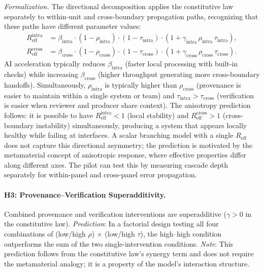 \documentclass[runningheads]{llncs}
\begin{document}
\emph{Formalization.} The directional decomposition applies the constitutive law separately to within-unit and cross-boundary propagation paths, recognizing that these paths have different parameter values:
\begin{align}
R_{\mathrm{eff}}^{\mathrm{intra}} &= \beta_{\mathrm{intra}} \cdot (1-\rho_{\mathrm{intra}}) \cdot (1-\tau_{\mathrm{intra}}) \cdot (1+\gamma_{\mathrm{intra}}\, \rho_{\mathrm{intra}}\, \tau_{\mathrm{intra}}), \label{eq:rintra} \\
R_{\mathrm{eff}}^{\mathrm{cross}} &= \beta_{\mathrm{cross}} \cdot (1-\rho_{\mathrm{cross}}) \cdot (1-\tau_{\mathrm{cross}}) \cdot (1+\gamma_{\mathrm{cross}}\, \rho_{\mathrm{cross}}\, \tau_{\mathrm{cross}}). \label{eq:rcross}
\end{align}
AI acceleration typically reduces $\beta_{\mathrm{intra}}$ (faster local processing with built-in checks) while increasing $\beta_{\mathrm{cross}}$ (higher throughput generating more cross-boundary handoffs). Simultaneously, $\rho_{\mathrm{intra}}$ is typically higher than $\rho_{\mathrm{cross}}$ (provenance is easier to maintain within a single system or team) and $\tau_{\mathrm{intra}} > \tau_{\mathrm{cross}}$ (verification is easier when reviewer and producer share context). The anisotropy prediction follows: it is possible to have $R_{\mathrm{eff}}^{\mathrm{intra}} < 1$ (local stability) and $R_{\mathrm{eff}}^{\mathrm{cross}} > 1$ (cross-boundary instability) simultaneously, producing a system that appears locally healthy while failing at interfaces. A scalar branching model with a single $R_{\mathrm{eff}}$ does not capture this directional asymmetry; the prediction is motivated by the metamaterial concept of anisotropic response, where effective properties differ along different axes. The pilot can test this by measuring cascade depth separately for within-panel and cross-panel error propagation.

\paragraph{H3: Provenance--Verification Superadditivity.}
Combined provenance and verification interventions are superadditive ($\gamma > 0$ in the constitutive law). \emph{Prediction}: In a factorial design testing all four combinations of (low/high $\rho$) $\times$ (low/high $\tau$), the high--high condition outperforms the sum of the two single-intervention conditions. \emph{Note}: This prediction follows from the constitutive law's synergy term and does not require the metamaterial analogy; it is a property of the model's interaction structure.
\end{document}
